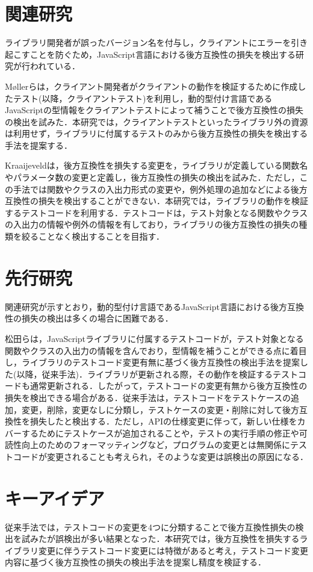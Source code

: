 \documentclass[11pt,dvipdfmx]{jreport}
\begin{document}
\section{関連研究}
ライブラリ開発者が誤ったバージョン名を付与し，クライアントにエラーを引き起こすことを防ぐため，JavaScript言語における後方互換性の損失を検出する研究が行われている．

Møllerらは，クライアント開発者がクライアントの動作を検証するために作成したテスト(以降，クライアントテスト)を利用し，動的型付け言語であるJavaScriptの型情報をクライアントテストによって補うことで後方互換性の損失の検出を試みた\cite{type-regression-testing}\cite{model-based-testing}．本研究では，クライアントテストといったライブラリ外の資源は利用せず，ライブラリに付属するテストのみから後方互換性の損失を検出する手法を提案する．

Kraaijeveldは，後方互換性を損失する変更を，ライブラリが定義している関数名やパラメータ数の変更と定義し，後方互換性の損失の検出を試みた\cite{detecting-breaking-changes-in-js-apis}．ただし，この手法では関数やクラスの入出力形式の変更や，例外処理の追加などによる後方互換性の損失を検出することができない．本研究では，ライブラリの動作を検証するテストコードを利用する．テストコードは，テスト対象となる関数やクラスの入出力の情報や例外の情報を有しており，ライブラリの後方互換性の損失の種類を絞ることなく検出することを目指す．

\section{先行研究}
関連研究が示すとおり，動的型付け言語であるJavaScript言語における後方互換性の損失の検出は多くの場合に困難である．

松田らは，JavaScriptライブラリに付属するテストコードが，テスト対象となる関数やクラスの入出力の情報を含んでおり，型情報を補うことができる点に着目し，ライブラリのテストコード変更有無に基づく後方互換性の検出手法を提案した\cite{matsuda}(以降，従来手法)．ライブラリが更新される際，その動作を検証するテストコードも通常更新される．したがって，テストコードの変更有無から後方互換性の損失を検出できる場合がある．従来手法は，テストコードをテストケースの追加，変更，削除，変更なしに分類し，テストケースの変更・削除に対して後方互換性を損失したと検出する．ただし，APIの仕様変更に伴って，新しい仕様をカバーするためにテストケースが追加されることや，テストの実行手順の修正や可読性向上のためのフォーマッティングなど，プログラムの変更とは無関係にテストコードが変更されることも考えられ，そのような変更は誤検出の原因になる．

\section{キーアイデア}\label{sec:key-idea}
従来手法では，テストコードの変更を4つに分類することで後方互換性損失の検出を試みたが誤検出が多い結果となった．本研究では，後方互換性を損失するライブラリ変更に伴うテストコード変更には特徴があると考え，テストコード変更内容に基づく後方互換性の損失の検出手法を提案し精度を検証する．
\end{document}
